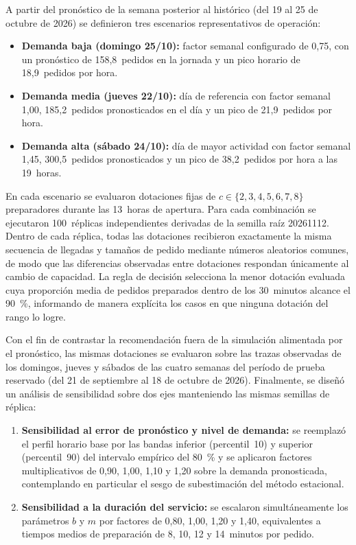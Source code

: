 A partir del pronóstico de la semana posterior al histórico (del 19 al 25 de octubre de 2026) se definieron tres escenarios representativos de operación:
\begin{itemize}
  \item \textbf{Demanda baja (domingo 25/10):} factor semanal configurado de 0,75, con un pronóstico de 158,8~pedidos en la jornada y un pico horario de 18,9~pedidos por hora.
  \item \textbf{Demanda media (jueves 22/10):} día de referencia con factor semanal 1,00, 185,2~pedidos pronosticados en el día y un pico de 21,9~pedidos por hora.
  \item \textbf{Demanda alta (sábado 24/10):} día de mayor actividad con factor semanal 1,45, 300,5~pedidos pronosticados y un pico de 38,2~pedidos por hora a las 19~horas.
\end{itemize}

En cada escenario se evaluaron dotaciones fijas de $c \in \{2, 3, 4, 5, 6, 7, 8\}$ preparadores durante las 13~horas de apertura.
Para cada combinación se ejecutaron 100~réplicas independientes derivadas de la semilla raíz 20261112.
Dentro de cada réplica, todas las dotaciones recibieron exactamente la misma secuencia de llegadas y tamaños de pedido mediante números aleatorios comunes, de modo que las diferencias observadas entre dotaciones respondan únicamente al cambio de capacidad.
La regla de decisión selecciona la menor dotación evaluada cuya proporción media de pedidos preparados dentro de los 30~minutos alcance el 90~\%, informando de manera explícita los casos en que ninguna dotación del rango lo logre.

Con el fin de contrastar la recomendación fuera de la simulación alimentada por el pronóstico, las mismas dotaciones se evaluaron sobre las trazas observadas de los domingos, jueves y sábados de las cuatro semanas del período de prueba reservado (del 21 de septiembre al 18 de octubre de 2026).
Finalmente, se diseñó un análisis de sensibilidad sobre dos ejes manteniendo las mismas semillas de réplica:
\begin{enumerate}
  \item \textbf{Sensibilidad al error de pronóstico y nivel de demanda:} se reemplazó el perfil horario base por las bandas inferior (percentil~10) y superior (percentil~90) del intervalo empírico del 80~\% y se aplicaron factores multiplicativos de 0,90, 1,00, 1,10 y 1,20 sobre la demanda pronosticada, contemplando en particular el sesgo de subestimación del método estacional.
  \item \textbf{Sensibilidad a la duración del servicio:} se escalaron simultáneamente los parámetros $b$ y $m$ por factores de 0,80, 1,00, 1,20 y 1,40, equivalentes a tiempos medios de preparación de 8, 10, 12 y 14~minutos por pedido.
\end{enumerate}

